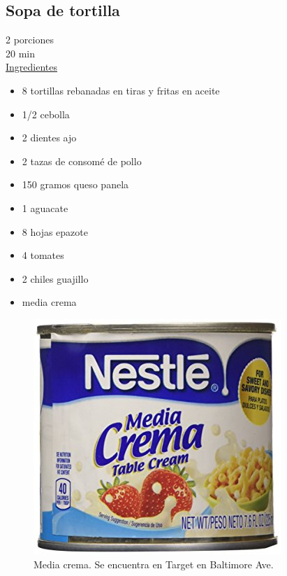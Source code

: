\subsection{Sopa de tortilla}\label{sopa_tortilla}

2 porciones\\
20 min \\


\underline{Ingredientes}
\begin{itemize}
\item 8 tortillas rebanadas en tiras y fritas en aceite
\item 1/2 cebolla
\item 2 dientes ajo
\item 2 tazas de consomé de pollo 
\item 150 gramos queso panela
\item 1 aguacate
\item 8 hojas epazote
\item 4 tomates
\item 2 chiles guajillo 
\item media crema 
\end{itemize}

\begin{figure}[H]
\centering
\includegraphics[scale=0.2]{recetas/sopa-de-tortilla/figures/media_crema}
\caption{Media crema. Se encuentra en Target en Baltimore Ave.}
\end{figure}

